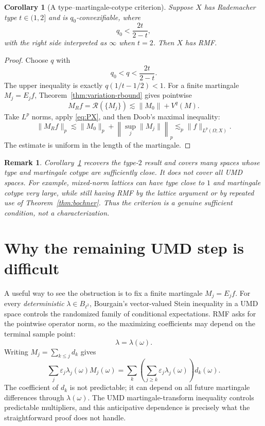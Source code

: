 \documentclass[11pt]{article}
\newtheorem{corollary}[theorem]{Corollary}
\newtheorem{remark}[theorem]{Remark}
\theoremstyle{definition}
\newcommand{\cR}{\mathcal R}
\newcommand{\1}{\mathbf 1}
\newcommand{\eps}{\varepsilon}
\begin{document}
\begin{corollary}[A type--martingale-cotype criterion]\label{cor:variation-rmf}
Suppose $X$ has Rademacher type $t\in(1,2]$ and is $q_0$-convexifiable, where
\begin{equation}\label{eq:criterion}
 q_0<\frac{2t}{2-t},
\end{equation}
with the right side interpreted as $\infty$ when $t=2$.  Then $X$ has RMF.
\end{corollary}

\begin{proof}
Choose $q$ with
\[
 q_0<q<\frac{2t}{2-t}.
\]
The upper inequality is exactly
$q(1/t-1/2)<1$.  For a finite martingale
$M_j=E_jf$, Theorem~\ref{thm:variation-rbound} gives pointwise
\[
 M_Rf=\cR(\{M_j\})\lesssim \|M_0\|+V^q(M).
\]
Take $L^p$ norms, apply \eqref{eq:PX}, and then Doob's maximal inequality:
\[
 \|M_Rf\|_p
 \lesssim \|M_0\|_p+
 \left\|\sup_j\|M_j\|\right\|_p
 \lesssim_p \|f\|_{L^p(\Omega;X)}.
\]
The estimate is uniform in the length of the martingale.
\end{proof}

\begin{remark}
Corollary~\ref{cor:variation-rmf} recovers the type-$2$ result and covers many
spaces whose type and martingale cotype are sufficiently close.  It does not
cover all UMD spaces.  For example, mixed-norm lattices can have type close to
$1$ and martingale cotype very large, while still having RMF by the lattice
argument or by repeated use of Theorem~\ref{thm:bochner}.  Thus the criterion is
a genuine sufficient condition, not a characterization.
\end{remark}

\section{Why the remaining UMD step is difficult}

A useful way to see the obstruction is to fix a finite martingale
$M_j=E_jf$.  For every \emph{deterministic} $\lambda\in B_{\ell^2}$, Bourgain's
vector-valued Stein inequality in a UMD space controls the randomized family of
conditional expectations.  RMF asks for the pointwise operator norm, so the
maximizing coefficients may depend on the terminal sample point:
\[
 \lambda=\lambda(\omega).
\]
Writing $M_j=\sum_{k\le j}d_k$ gives
\[
 \sum_j\eps_j\lambda_j(\omega)M_j(\omega)
 =\sum_k\left(\sum_{j\ge k}\eps_j\lambda_j(\omega)\right)d_k(\omega).
\]
The coefficient of $d_k$ is not predictable; it can depend on all future
martingale differences through $\lambda(\omega)$.  The UMD martingale-transform
inequality controls predictable multipliers, and this anticipative dependence is
precisely what the straightforward proof does not handle.
\end{document}
